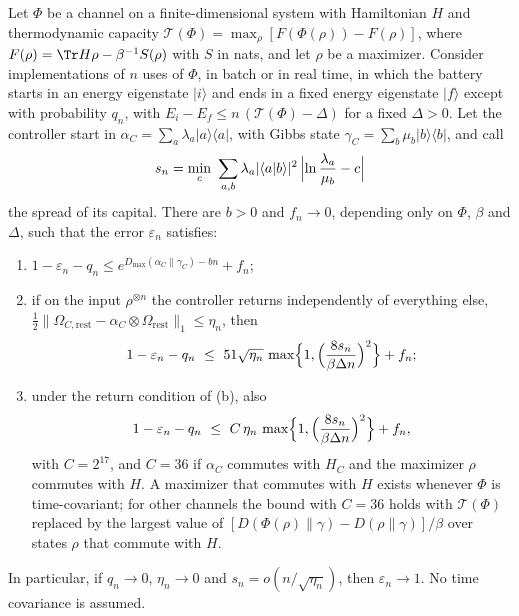 \begin{proposition}\label{kt:prop:capital-converse}
Let $\Phi$ be a channel on a finite-dimensional system with Hamiltonian $H$ and thermodynamic capacity $\mathcal T(\Phi)=\max_\rho[F(\Phi(\rho))-F(\rho)]$, where $F(\rho)=\Tr H\rho-\beta^{-1}S(\rho)$ with $S$ in nats, and let $\rho$ be a maximizer. Consider implementations of $n$ uses of $\Phi$, in batch or in real time, in which the battery starts in an energy eigenstate $|i\rangle$ and ends in a fixed energy eigenstate $|f\rangle$ except with probability $q_n$, with $E_i-E_f\le n\,(\mathcal T(\Phi)-\Delta)$ for a fixed $\Delta>0$. Let the controller start in $\alpha_C=\sum_a\lambda_a|a\rangle\langle a|$, with Gibbs state $\gamma_C=\sum_b\mu_b|b\rangle\langle b|$, and call
\[
s_n=\min_c\ \sum_{a,b}\lambda_a|\langle a|b\rangle|^2\,\Bigl|\ln\frac{\lambda_a}{\mu_b}-c\Bigr|
\]
the spread of its capital. There are $b>0$ and $f_n\to0$, depending only on $\Phi$, $\beta$ and $\Delta$, such that the error $\varepsilon_n$ satisfies:
\begin{enumerate}
\item[(a)] $1-\varepsilon_n-q_n\le e^{D_{\max}(\alpha_C\|\gamma_C)-bn}+f_n$;
\item[(b)] if on the input $\rho^{\otimes n}$ the controller returns independently of everything else, $\tfrac12\|\Omega_{C,\mathrm{rest}}-\alpha_C\otimes\Omega_{\mathrm{rest}}\|_1\le\eta_n$, then
\[
1-\varepsilon_n-q_n\ \le\ 51\sqrt{\eta_n}\,\max\Bigl\{1,\Bigl(\frac{8s_n}{\beta\Delta n}\Bigr)^2\Bigr\}+f_n;
\]
\item[(c)] under the return condition of (b), also
\[
1-\varepsilon_n-q_n\ \le\ C\,\eta_n\,\max\Bigl\{1,\Bigl(\frac{8s_n}{\beta\Delta n}\Bigr)^2\Bigr\}+f_n,
\]
with $C=2^{17}$, and $C=36$ if $\alpha_C$ commutes with $H_C$ and the maximizer $\rho$ commutes with $H$. A maximizer that commutes with $H$ exists whenever $\Phi$ is time-covariant; for other channels the bound with $C=36$ holds with $\mathcal T(\Phi)$ replaced by the largest value of $[D(\Phi(\rho)\|\gamma)-D(\rho\|\gamma)]/\beta$ over states $\rho$ that commute with $H$.
\end{enumerate}
In particular, if $q_n\to0$, $\eta_n\to0$ and $s_n=o(n/\sqrt{\eta_n})$, then $\varepsilon_n\to1$. No time covariance is assumed.
\end{proposition}

